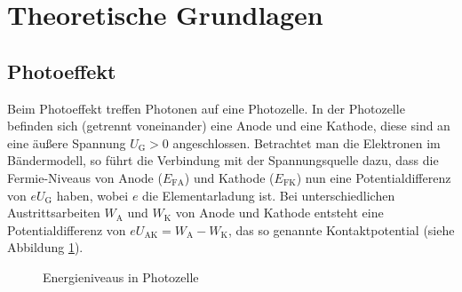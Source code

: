 \section{Theoretische Grundlagen}

\subsection{Photoeffekt}
Beim Photoeffekt treffen Photonen auf eine Photozelle. In der Photozelle befinden sich (getrennt voneinander) eine Anode und eine Kathode, diese sind an eine äußere Spannung $U_\mathrm{G}>0$ angeschlossen. Betrachtet man die Elektronen im Bändermodell, so führt die Verbindung mit der Spannungsquelle dazu, dass die Fermie-Niveaus von Anode ($E_\mathrm{FA}$) und Kathode ($E_\mathrm{FK}$) nun eine Potentialdifferenz von $e U_\mathrm{G}$ haben, wobei $e$ die Elementarladung ist. Bei unterschiedlichen Austrittsarbeiten $W_\mathrm{A}$ und $W_\mathrm{K}$ von Anode und Kathode entsteht eine Potentialdifferenz von $eU_\mathrm{AK}=W_\mathrm{A}-W_\mathrm{K}$, das so genannte Kontaktpotential (siehe Abbildung \ref{Photozelle}). 

\begin{figure}[h]
  \centering
  \caption{Energieniveaus in Photozelle}
  \label{Photozelle}
\end{figure}

